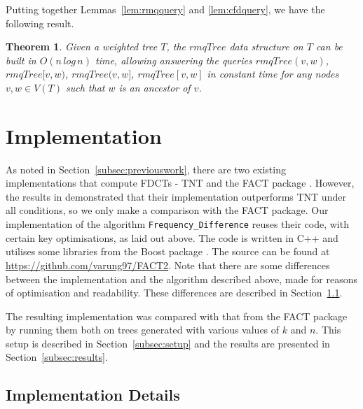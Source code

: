\documentclass[final,1p,times]{elsarticle}
\newtheorem{theorem}{Theorem}
\begin{document}
Putting together Lemmas~\ref{lem:rmqquery} and \ref{lem:cfdquery}, we have the following result.
    \begin{theorem}
        \label{theorem:rmqtreequery}
        Given a weighted tree $T$, the $rmqTree$ data structure on $T$ can be built in $O(n\,log\,n)$ time, allowing answering the queries $rmqTree(v, w)$, $rmqTree[v, w)$, $rmqTree(v, w]$, $rmqTree[v, w]$ in constant time for any nodes $v, w \in V(T)$ such that $w$ is an ancestor of $v$.
    \end{theorem}



    \section{Implementation}
    \label{sec:implementation}

    As noted in Section~\ref{subsec:previouswork}, there are two existing implementations that compute FDCTs - TNT \cite{goloboff2008tnt} and the FACT package \cite{jansson2016improved}. However, the results in \cite{jansson2018algorithms} demonstrated that their implementation outperforms TNT under all conditions, so we only make a comparison with the FACT package. Our implementation of the algorithm \texttt{Frequency\_Difference} reuses their code, with certain key optimisations, as laid out above. The code is written in C++ and utilises some libraries from the Boost package \cite{BoostLibrary}. The source can be found at \url{https://github.com/varung97/FACT2}. Note that there are some differences between the implementation and the algorithm described above, made for reasons of optimisation and readability. These differences are described in Section~\ref{subsec:implementationdetails}.

    The resulting implementation was compared with that from the FACT package by running them both on trees generated with various values of $k$ and $n$. This setup is described in Section~\ref{subsec:setup} and the results are presented in Section~\ref{subsec:results}.

    \subsection{Implementation Details}
    \label{subsec:implementationdetails}
\end{document}
